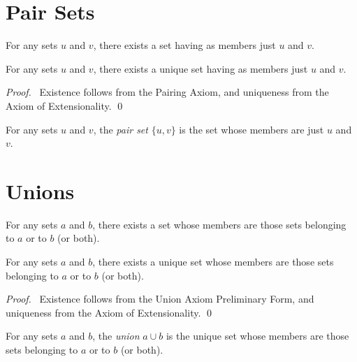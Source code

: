 \section{Pair Sets}

\begin{axiom}
    For any sets $u$ and $v$, there exists a set having as members just $u$ and $v$.
\end{axiom}

\begin{proposition}
    For any sets $u$ and $v$, there exists a unique set having as members just $u$ and $v$.
\end{proposition}

\begin{proof}
    \pf\ Existence follows from the Pairing Axiom, and uniqueness from the Axiom of Extensionality. \qed
\end{proof}

\begin{definition}
    For any sets $u$ and $v$, the \emph{pair set} $\{ u, v \}$ is the set whose members are just $u$ and $v$.    
\end{definition}

\section{Unions}

\begin{axiom}
    For any sets $a$ and $b$, there exists a set whose members are those sets belonging to $a$ or to $b$ (or both).
\end{axiom}

\begin{proposition}
    For any sets $a$ and $b$, there exists a unique set whose members are those sets belonging to $a$ or to $b$ (or both).
\end{proposition}

\begin{proof}
    \pf\ Existence follows from the Union Axiom Preliminary Form, and uniqueness from the Axiom of Extensionality. \qed
\end{proof}

\begin{definition}
    For any sets $a$ and $b$, the \emph{union} $a \cup b$ is the unique set whose members are those sets belonging to $a$ or to $b$ (or both).
\end{definition}


